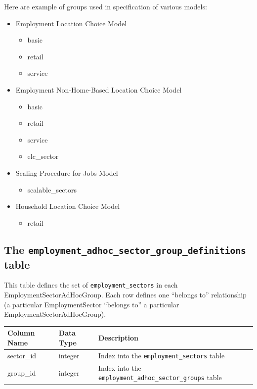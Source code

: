 Here are example of groups used in specification of various models:
\begin{itemize} \tight
\item Employment Location Choice Model 
\begin{itemize} \tight
\item basic
\item retail
\item service

\end{itemize}
\item Employment Non-Home-Based Location Choice Model 
\begin{itemize} \tight
\item basic
\item retail
\item service
\item elc_sector

\end{itemize}
\item Scaling Procedure for Jobs Model 
\begin{itemize} \tight
\item scalable_sectors

\end{itemize}
\item Household Location Choice Model 
\begin{itemize} \tight
\item retail

\end{itemize}

\end{itemize}

\subsection{The {\tt employment_adhoc_sector_group_definitions} table}

This table defines the set of \verb|employment_sectors| in each
EmploymentSectorAdHocGroup. Each row defines one ``belongs to'' relationship (a
particular EmploymentSector ``belongs to'' a particular
EmploymentSectorAdHocGroup).

\begin{tabular}{lll}
\textbf{Column Name} & \textbf{Data Type} & \textbf{Description} \\
\hline
sector_id & integer & Index into the \verb|employment_sectors| table  \\
\hline
group_id & integer & Index into the \verb|employment_adhoc_sector_groups| table  \\
\hline
\end{tabular}

